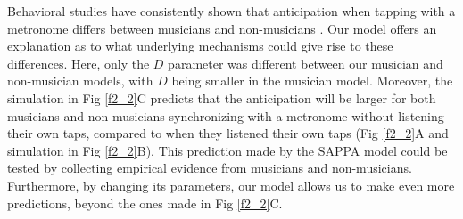 \documentclass{report}
\begin{document}
Behavioral studies have consistently shown that anticipation when tapping with a metronome differs between musicians and non-musicians \cite{mates1994temporal, repp2007tapping, miyake2004two}. Our model offers an explanation as to what underlying mechanisms could give rise to these differences. Here, only the $D$ parameter was different between our musician and non-musician models, with $D$ being smaller in the musician model. Moreover, the simulation in Fig \ref{f2_2}C predicts that the anticipation will be larger for both musicians and non-musicians synchronizing with a metronome without listening their own taps, compared to when they listened their own taps (Fig \ref{f2_2}A and simulation in Fig \ref{f2_2}B). This prediction made by the SAPPA model could be tested by collecting empirical evidence from musicians and non-musicians. Furthermore, by changing its parameters, our model allows us to make even more predictions, beyond the ones made in Fig \ref{f2_2}C.
\end{document}
